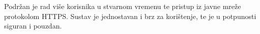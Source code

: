 		Podržan je rad više korisnika u stvarnom vremenu te pristup iz javne mreže protokolom HTTPS. Sustav je jednostavan i brz za korištenje, te je u potpunosti siguran i pouzdan.

		\eject
		
